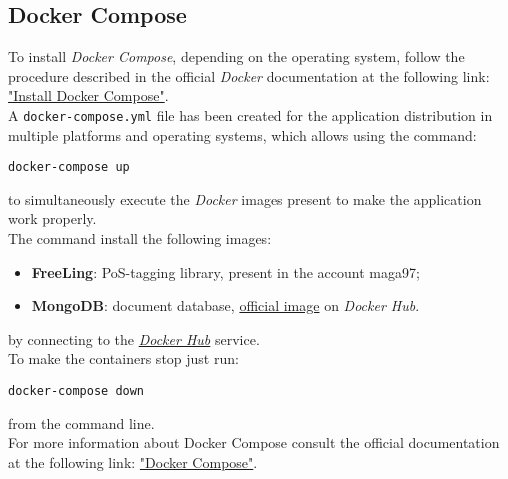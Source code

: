 \subsection{Docker Compose}
\label{sec:DockerCompose}
To install \textit{Docker Compose}, depending on the operating system, follow the procedure described in the official \textit{Docker} documentation at the following link: \href{https://docs.docker.com/compose/install/}{"Install Docker Compose"}.\\
A \texttt{docker-compose.yml} file has been created for the application distribution in multiple platforms and operating systems, which allows using the command:
\begin{center}
\texttt{docker-compose up}
\end{center}
to simultaneously execute the \textit{Docker} images present to make the application work properly.\\
The command install the following images:
\begin{itemize}
\item \textbf{FreeLing}: PoS-tagging library, present in the account maga97;
\item \textbf{MongoDB}: document database, \href{https://docs.docker.com/docker-hub/official_images/}{official image} on \textit{Docker Hub}.
\end{itemize}
by connecting to the \textit{\href{https://hub.docker.com/}{Docker Hub}} service.\\
To make the containers stop just run:
\begin{center}
\texttt{docker-compose down} 
\end{center} from the command line.\\
For more information about Docker Compose consult the official documentation at the following link: \href{https://docs.docker.com/compose/}{"Docker Compose"}. 

